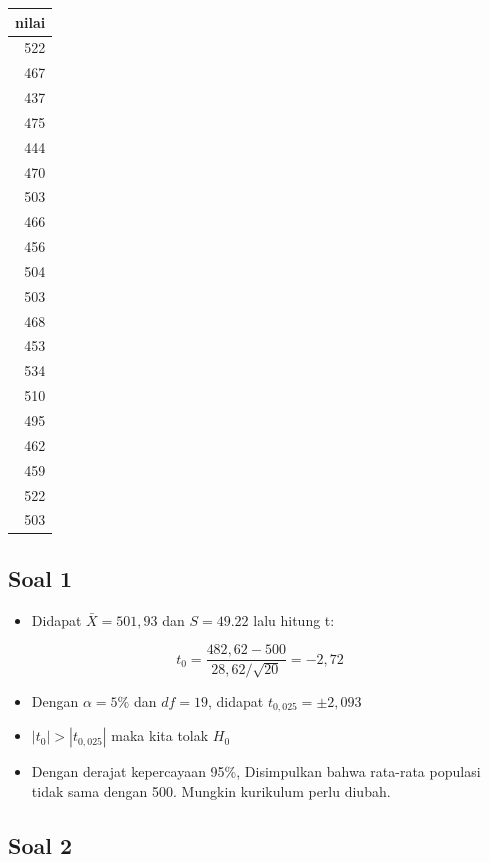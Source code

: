 \documentclass[
  letterpaper,
  DIV=11,
  numbers=noendperiod]{scrartcl}
\providecommand{\tightlist}{%
  \setlength{\itemsep}{0pt}\setlength{\parskip}{0pt}}\usepackage{longtable,booktabs,array}
\begin{document}
\begin{tabular}[t]{r}
\hline
nilai\\
\hline
522\\
\hline
467\\
\hline
437\\
\hline
475\\
\hline
444\\
\hline
470\\
\hline
503\\
\hline
466\\
\hline
456\\
\hline
504\\
\hline
503\\
\hline
468\\
\hline
453\\
\hline
534\\
\hline
510\\
\hline
495\\
\hline
462\\
\hline
459\\
\hline
522\\
\hline
503\\
\hline
\end{tabular}

\subsection{Soal 1}\label{soal-1-1}

\begin{itemize}
\tightlist
\item
  Didapat \(\bar{X}=501,93\) dan \(S=49.22\) lalu hitung t:
\end{itemize}

\[
t_0=\frac{482,62-500}{28,62/\sqrt{20}}=-2,72
\]

\begin{itemize}
\item
  Dengan \(\alpha=5\%\) dan \(df=19\), didapat \(t_{0,025}=\pm2,093\)
\item
  \(|t_0| > |t_{0,025}|\) maka kita tolak \(H_0\)
\item
  Dengan derajat kepercayaan 95\%, Disimpulkan bahwa rata-rata populasi
  tidak sama dengan 500. Mungkin kurikulum perlu diubah.
\end{itemize}

\subsection{Soal 2}\label{soal-2}
\end{document}
